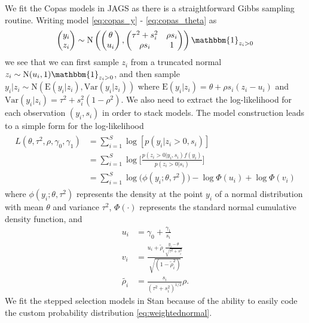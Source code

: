 \documentclass[12pt]{article}   	%
\numberwithin{equation}{section}
\begin{document}
We fit the Copas models in JAGS \citep{plummer2003jags} as there is a straightforward Gibbs sampling routine. Writing model \eqref{eq:copas_y} - \eqref{eq:copas_theta} as 
\begin{align}
\begin{pmatrix}
y_i \\
z_i
\end{pmatrix}\sim \text{N} \left(\begin{pmatrix}
\theta \\
u_i
\end{pmatrix},\begin{pmatrix}
\tau^2 + s_i^2 & \rho s_i \\
\rho s_i & 1
\end{pmatrix}\right) \mathbbm{1}_{z_i > 0} \label{eq:copas_rewrite}
\end{align}
we see that we can first sample $z_i$ from a truncated normal $z_i \sim \text{N}(u_i, 1) \mathbbm{1}_{z_i > 0}$, and then sample $y_i \vert z_i \sim \text{N}(\text{E}(y_i \vert z_i), \text{Var}(y_i \vert z_i))$ where $\text{E}(y_i \vert z_i) = \theta + \rho s_i (z_i - u_i)$ and $\text{Var}(y_i \vert z_i) = \tau^2 + s_i^2 (1 - \rho ^ 2)$. We also need to extract the log-likelihood for each observation $(y_i, s_i)$ in order to stack models. The model construction \label{eq:copas_rewrite} leads to a simple form for the log-likelihood 
\begin{align}
\begin{split}
L(\theta, \tau^2, \rho, \gamma_0, \gamma_1) &= \sum_{i = 1} ^ S \log[p(y_i \vert z_i > 0, s_i)] \\
& = \sum_{i = 1} ^ S \log \Bigg[ \frac{p(z_i > 0 \vert y_i, s_i) f(y_i)}{p(z_i > 0 \vert s_i)} \Bigg] \\
& = \sum_{i = 1} ^ S \log\big(\phi(y_i ; \theta, \tau^2)\big) - \log \Phi(u_i) + \log \Phi(v_i) \label{eq:loglik}
\end{split}
\end{align}
where $\phi(y_i; \theta, \tau^2)$ represents the density at the point $y_i$ of a normal distribution with mean $\theta$ and variance $\tau^2$, $\Phi(\cdot)$ represents the standard normal cumulative density function, and 
\begin{align}
u_i &= \gamma_0 + \frac{\gamma_1}{s_i} \nonumber \\
v_i &= \frac{u_i + \tilde{\rho}_i \frac{y_i - \theta}{\sqrt{\tau^2 + s_i^2}}}{\sqrt{(1 - \tilde{\rho}_i^2)}} \nonumber \\
\tilde{\rho_i} &= \frac{s_i}{(\tau^2 + s_i^2)^{1/2}} \rho. \nonumber
\end{align}
We fit the stepped selection models in Stan \citep{gelman2015stan} because of the ability to easily code the custom probability distribution \eqref{eq:weightednormal}. 
\end{document}
